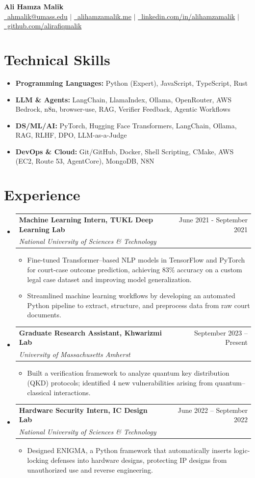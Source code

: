 \documentclass[letterpaper,11pt]{article}
\makeatletter
\newcommand{\resumeItem}[1]{%
  \item{#1 \vspace{-2pt}}%
}
\newcommand{\resumeSubheading}[4]{%
  \vspace{-2pt}\item
  \begin{tabular*}{0.989\textwidth}[t]{l@{\extracolsep{\fill}}r}
    \textbf{#1} & #2 \\
    \textit{\small #3} & \textit{\small #4} \\
  \end{tabular*}\vspace{-7pt}%
}
\newcommand{\resumeSubHeadingListStart}{\begin{itemize}[leftmargin=0.15in,label={},left=0pt]}
\newcommand{\resumeSubHeadingListEnd}{\end{itemize}}
\newcommand{\resumeItemListStart}{\begin{itemize}[left=10pt,itemsep=1.5pt]}
\newcommand{\resumeItemListEnd}{\end{itemize}\vspace{-5pt}}
\makeatother
\begin{document}
\begin{center}
    \textbf{\huge Ali Hamza Malik} \\ \vspace{5pt}
    \small
    \href{mailto:ahmalik@umass.edu}{\raisebox{-0.05\height}\faEnvelope \ ahmalik@umass.edu}
      $|$ \href{https://alihamzamalik.me/}{{\raisebox{-0.05\height}\faGlobeAmericas\ alihamzamalik.me}}
      $|$
      \href{https://linkedin.com/in/alihamzamalik}{\raisebox{-0.05\height}\faLinkedin\ linkedin.com/in/alihamzamalik}
      $|$ \href{https://github.com/alirafiqmalik}{\raisebox{-0.05\height}\faGithub  \ github.com/alirafiqmalik} 
      \vspace{-6pt}
\end{center}



\section{Technical Skills}
\resumeSubHeadingListStart
  \resumeItem{\textbf{Programming Languages:} Python (Expert), JavaScript, TypeScript, Rust}
  \resumeItem{\textbf{LLM \& Agents:} LangChain, LlamaIndex, Ollama, OpenRouter, AWS Bedrock, n8n, browser-use, RAG, Verifier Feedback, Agentic Workflows}
  \resumeItem{\textbf{DS/ML/AI:} PyTorch, Hugging Face Transformers, LangChain, Ollama, RAG, RLHF, DPO, LLM-as-a-Judge}
  \resumeItem{\textbf{DevOps \& Cloud:} Git/GitHub, Docker, Shell Scripting, CMake, AWS (EC2, Route 53, AgentCore), MongoDB, N8N}
\resumeSubHeadingListEnd

\section{Experience}
\resumeSubHeadingListStart
    \resumeSubheading
      {Machine Learning Intern, TUKL Deep Learning Lab}{June 2021 - September 2021}
      {National University of Sciences \& Technology}{}
      \resumeItemListStart
    \resumeItem{Fine-tuned Transformer–based NLP models in TensorFlow and PyTorch for court-case outcome prediction, achieving 83\% accuracy on a custom legal case dataset and improving model generalization.}
    \resumeItem{Streamlined machine learning workflows by developing an automated Python pipeline to extract, structure, and preprocess data from raw court documents.}
      \resumeItemListEnd
    \resumeSubheading
      {Graduate Research Assistant, Khwarizmi Lab}{September 2023 -- Present}
      {University of Massachusetts Amherst}{}
      \resumeItemListStart
    \resumeItem{Built a verification framework to analyze quantum key distribution (QKD) protocols; identified 4 new vulnerabilities arising from quantum–classical interactions.}
      \resumeItemListEnd
    \resumeSubheading
      {Hardware Security Intern, IC Design Lab}{June 2022 -- September 2022}
      {National University of Sciences \& Technology}{}
      \resumeItemListStart
    \resumeItem{Designed ENIGMA, a Python framework that automatically inserts logic-locking defenses into hardware designs, protecting IP designs from unauthorized use and reverse engineering.}
      \resumeItemListEnd
\resumeSubHeadingListEnd
\end{document}

